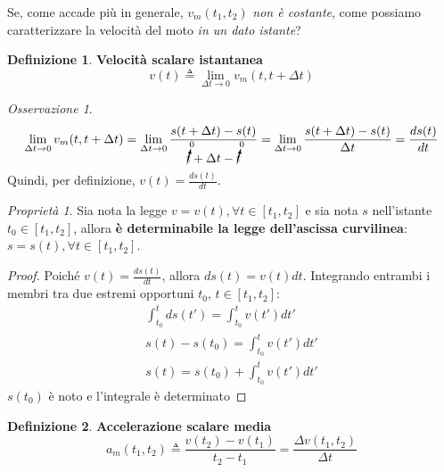 \documentclass[a4paper, 12pt]{report}
\theoremstyle{definition}
\newtheorem{definition}{Definizione}[section]
\theoremstyle{remark}
\newtheorem*{remark}{Osservazione}
\newtheorem*{prop}{Proprietà}
\theoremstyle{plain}
\begin{document}
Se, come accade più in generale, $v_m(t_1, t_2)$ {\it non è costante}, come possiamo caratterizzare la velocità del moto {\it in un dato istante}?

\begin{definition}
    {\bf Velocità scalare istantanea}
    \begin{equation}
        v(t) \triangleq \lim_{\Delta t \to 0} v_m(t, t + \Delta t)  
    \end{equation}
\end{definition}

\begin{remark}
    \begin{equation}
        \lim_{\Delta t \to 0} v_m(t, t + \Delta t) = \lim_{\Delta t \to 0} \frac{s(t + \Delta t) - s(t)}{\cancelto{0}{t} + \Delta t - \cancelto{0}{t}} = \lim_{\Delta t \to 0} \frac{s(t + \Delta t) - s(t)}{\Delta t} = \frac{ds(t)}{dt}
    \end{equation}
    Quindi, per definizione, $v(t) = \frac{ds(t)}{dt}$.
\end{remark}

\begin{prop}
    Sia nota la legge $v = v(t), \forall t \in [t_1, t_2]$ e sia nota $s$ nell'istante $t_0 \in [t_1, t_2]$, allora {\bf è determinabile la legge dell'ascissa curvilinea}: $s = s(t), \forall t \in [t_1, t_2]$.
\end{prop}

\begin{proof}
    Poiché $v(t) = \frac{ds(t)}{dt}$, allora $ds(t) = v(t)dt$. Integrando entrambi i membri tra due estremi opportuni $t_0$, $t \in [t_1, t_2]$:
    \begin{gather}
        \nonumber \int_{t_0}^{t} ds(t') = \int_{t_0}^{t} v(t')dt'\\
        \nonumber s(t) - s(t_0) = \int_{t_0}^{t} v(t')dt'\\
        s(t) = s(t_0) + \int_{t_0}^{t} v(t')dt'
    \end{gather}
    $s(t_0)$ è noto e l'integrale è determinato
\end{proof}

\begin{definition}
    {\bf Accelerazione scalare media}
    \begin{equation}
        a_m(t_1, t_2) \triangleq \frac{v(t_2) - v(t_1)}{t_2 - t_1} = \frac{\Delta v(t_1, t_2)}{\Delta t}
    \end{equation}
\end{definition}
\end{document}
